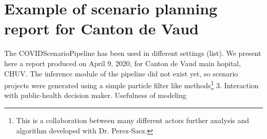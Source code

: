 \FloatBarrier

\section{Example of scenario planning report for Canton de Vaud}
The COVIDScenarioPipeline has been used in different settings (list). We present here a report produced on April 9, 2020, for Canton de Vaud main hopital, CHUV. The inference module of the pipeline did not exist yet, so scenario projects were generated using a simple particle filter like methods\footnote{This is a collaboration between many different actors further analysis and algorithm developed with Dr. Perez-Saez.}
3. Interaction with public-health decision maker. Usefulness of modeling


 

